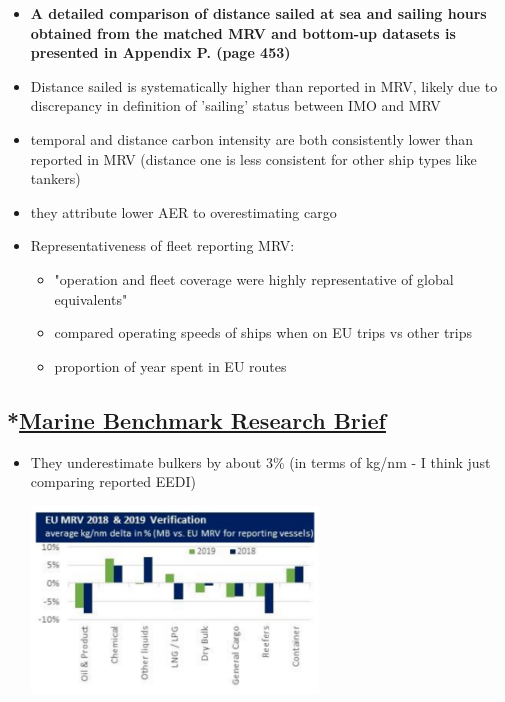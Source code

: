 \documentclass{article}
\newcommand{\paperpath}{../resources/}
\newcommand{\myhref}[2]{\href{run:\paperpath#1}{#2}}
\begin{document}
\begin{itemize}
\begin{center}
    \end{center}
    \item \textbf{A detailed comparison of distance sailed at sea and sailing hours obtained from the matched MRV and bottom-up datasets is presented in Appendix P. (page 453)}
    \item Distance sailed is systematically higher than reported in MRV, likely due to discrepancy in definition of 'sailing' status between IMO and MRV
    \item temporal and distance carbon intensity are both consistently lower than reported in MRV (distance one is less consistent for other ship types like tankers)
    \item they attribute lower AER to overestimating cargo
    \item Representativeness of fleet reporting MRV:
    \begin{itemize}
        \item "operation and fleet coverage were highly representative of global equivalents"
        \item compared operating speeds of ships when on EU trips vs other trips
        \item proportion of year spent in EU routes
    \end{itemize} 
\end{itemize}
\subsection{*\myhref{Marine Benchmark 2020 - Maritime CO2 Emissions.pdf}{Marine Benchmark Research Brief}}
\begin{itemize}
    \item They underestimate bulkers by about 3\% (in terms of kg/nm - I think just comparing reported EEDI)
    \begin{center}
    \includegraphics[width=0.6\textwidth]{"Marine Benchmark 2020 - MRV vs MB.png"}
    \end{center}
\end{itemize}
\end{document}
